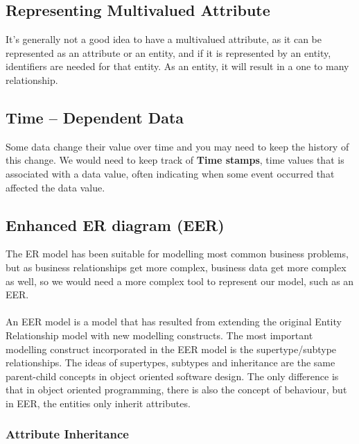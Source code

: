 \documentclass[12pt]{article}
\begin{document}
\subsection{Representing Multivalued Attribute}

It's generally not a good idea to have a multivalued attribute, as it can be represented as an attribute or an entity, and if it is represented by an entity, identifiers are needed for that entity. As an entity, it will result in a one to many relationship.

\subsection{Time -- Dependent Data}

Some data change their value over time and you may need to keep the history of this change. We would need to keep track of \textbf{Time stamps}, time values that is associated with a data value, often indicating when some event occurred that affected the data value.

\subsection{Enhanced ER diagram (EER)}

The ER model has been suitable for modelling most common business problems, but as business relationships get more complex, business data get more complex as well, so we would need a more complex tool to represent our model, such as an EER.\\
\\
An EER model is a model that has resulted from extending the original Entity Relationship model with new modelling constructs. The most important modelling construct incorporated in the EER model is the supertype/subtype relationships. The ideas of supertypes, subtypes and inheritance are the same parent-child concepts in object oriented software design. The only difference is that in object oriented programming, there is also the concept of behaviour, but in EER, the entities only inherit attributes.

\subsubsection{Attribute Inheritance}
\end{document}
